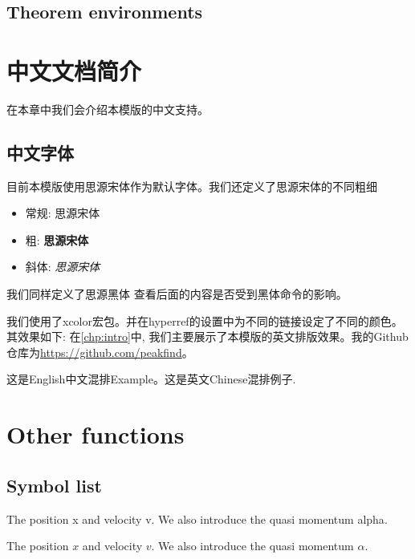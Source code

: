 \documentclass{mythesis}
\begin{document}
\section{Theorem environments}

\begin{theorem}
   \lipsum[2] 
\end{theorem}

\begin{definition}
   \lipsum[2] 
\end{definition}

\begin{lemma}
    \lipsum[2]
\end{lemma}

\begin{proposition}
   \lipsum[2] 
\end{proposition}

\begin{Proof}
   \lipsum[2] 
\end{Proof}

\chapter{中文文档简介}

在本章中我们会介绍本模版的中文支持。

\section{中文字体}

目前本模版使用思源宋体作为默认字体。我们还定义了思源宋体的不同粗细
\begin{itemize}
    \item 常规: 思源宋体 
    \item 粗: \textbf{思源宋体}
    \item 斜体: \textit{思源宋体}
\end{itemize}

我们同样定义了{\heiti 思源黑体} 查看后面的内容是否受到黑体命令的影响。

我们使用了xcolor宏包。并在hyperref的设置中为不同的链接设定了不同的颜色。其效果如下:
在\autoref{chp:intro}中, 我们主要展示了本模版的英文排版效果。我的Github仓库为\url{https://github.com/peakfind}。

这是English中文混排Example。这是英文Chinese混排例子.

\chapter{Other functions}

\section{Symbol list}

The position \gls{x} and velocity \gls{v}. We also introduce the quasi momentum \gls{alpha}.

The position $x$ and velocity $v$. We also introduce the quasi momentum $\alpha$.

\printnoidxglossaries
\end{document}
